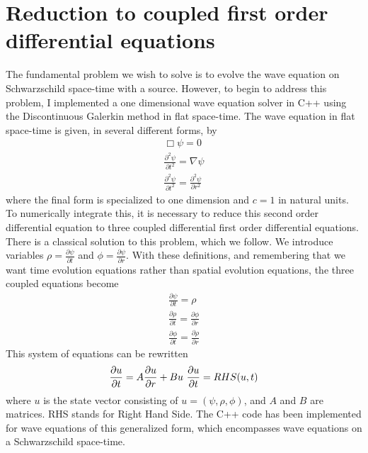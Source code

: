 \section{Reduction to coupled first order differential equations}


The fundamental problem we wish to solve is to evolve the wave equation on Schwarzschild space-time with a source. However, to begin to address this problem, I implemented a one dimensional wave equation solver in C++ using the Discontinuous Galerkin method in flat space-time. The wave equation in flat space-time is given, in several different forms, by
\begin{eqnarray}
  \Box\psi=0\\
  \frac{\partial^2\psi}{\partial t^2}=\nabla\psi\\
  \frac{\partial^2\psi}{\partial t^2}=\frac{\partial^2 \psi}{\partial r^2}
\end{eqnarray}
where the final form is specialized to one dimension and $c=1$ in natural units. To numerically integrate this, it is necessary to reduce this second order differential equation to three coupled differential first order differential equations. There is a classical solution to this problem, which we follow. We introduce variables $\rho=\frac{\partial \psi}{\partial t}$ and $\phi = \frac{\partial\psi}{\partial r}$. With these definitions, and remembering that we want time evolution equations rather than spatial evolution equations, the three coupled equations become
\begin{eqnarray}
  \frac{\partial\psi}{\partial t} = \rho\nonumber\\
  \frac{\partial\rho}{\partial t} = \frac{\partial \phi}{\partial r}\nonumber\\
  \frac{\partial\phi}{\partial t} = \frac{\partial \rho}{\partial r}
  \label{stateev}
\end{eqnarray}
This system of equations can be rewritten
\begin{equation}
  \frac{\partial u}{\partial t} = A\frac{\partial u}{\partial r} + Bu\nonumber\\\
  \frac{\partial u}{\partial t} = RHS(u,t)
  \label{matrixdiff}
\end{equation}
where $u$ is the state vector consisting of $u=(\psi,\rho,\phi)$, and $A$ and $B$ are matrices. RHS stands for Right Hand Side. The C++ code has been implemented for wave equations of this generalized form, which encompasses wave equations on a Schwarzschild space-time.




